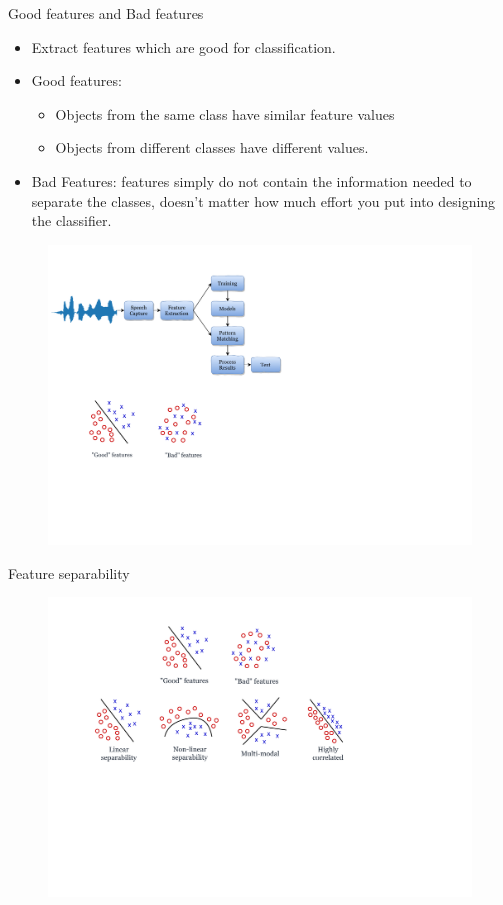 \begin{frame}{Good features and Bad features}
\begin{itemize}
\item Extract features which are good for {\color{maroon}classification}.
\item {\color{maroon}Good features}:
\begin{itemize}
\item Objects from the same class have similar feature values
\item Objects from different classes have different values.
\end{itemize}
\item {\color{maroon}Bad Features:} features simply do not contain the information needed to separate the classes, doesn't matter how much effort you put into designing the classifier.
\end{itemize}
\begin{figure}
\includegraphics[scale=0.7]{Figures/goodbadFeatures}
\end{figure}
\end{frame}

\begin{frame}{Feature separability}
\begin{figure}
\includegraphics[scale=0.63]{Figures/FeatureSep}
\end{figure}
\end{frame}

